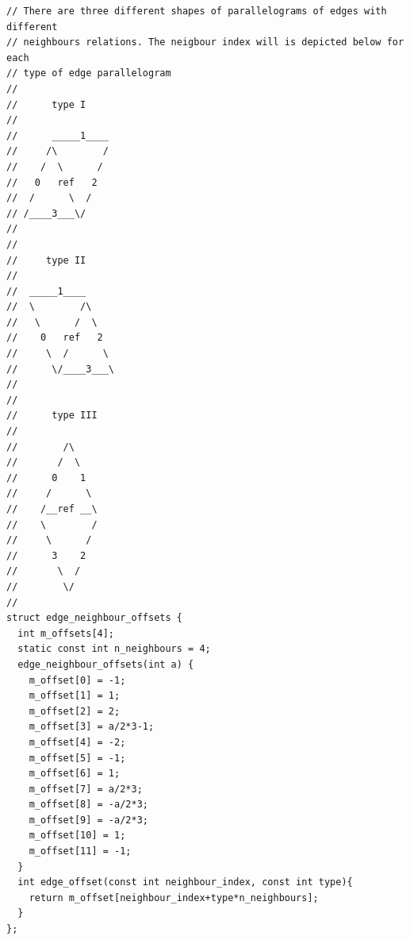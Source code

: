 \documentclass{book}
\begin{document}
\begin{verbatim}
// There are three different shapes of parallelograms of edges with different
// neighbours relations. The neigbour index will is depicted below for each
// type of edge parallelogram
// 
//      type I
//
//      _____1____
//     /\        /
//    /  \      /
//   0   ref   2
//  /      \  /
// /____3___\/ 
//
// 
//     type II
//
//  _____1____
//  \        /\
//   \      /  \
//    0   ref   2 
//     \  /      \
//      \/____3___\
//
//
//      type III
//
//        /\
//       /  \
//      0    1
//     /      \
//    /__ref __\
//    \        /
//     \      /
//      3    2
//       \  /
//        \/
//
struct edge_neighbour_offsets {
  int m_offsets[4];
  static const int n_neighbours = 4;
  edge_neighbour_offsets(int a) {
    m_offset[0] = -1;
    m_offset[1] = 1;
    m_offset[2] = 2;
    m_offset[3] = a/2*3-1;
    m_offset[4] = -2;
    m_offset[5] = -1;
    m_offset[6] = 1;
    m_offset[7] = a/2*3;
    m_offset[8] = -a/2*3;
    m_offset[9] = -a/2*3;
    m_offset[10] = 1;
    m_offset[11] = -1;
  }
  int edge_offset(const int neighbour_index, const int type){
    return m_offset[neighbour_index+type*n_neighbours];
  }
};
\end{verbatim}



{}
\end{document}

